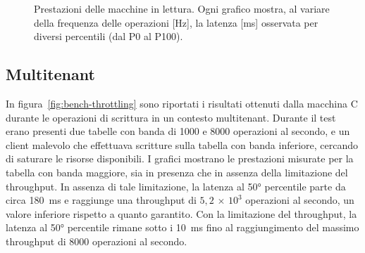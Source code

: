 \begin{figure}[htbp]
    \caption{Prestazioni delle macchine in lettura. Ogni grafico mostra, al variare della frequenza delle operazioni [Hz], la latenza [ms] osservata per diversi percentili (dal P0 al P100).}
    \label{fig:bench-get}
\end{figure}

\subsection{Multitenant}
\label{subsec:risultati-multitenant}

In figura~\ref{fig:bench-throttling} sono riportati i risultati ottenuti dalla macchina C durante le operazioni di scrittura in un contesto multitenant.
Durante il test erano presenti due tabelle con banda di 1000 e 8000 operazioni al secondo, e un client malevolo che effettuava scritture sulla tabella con banda inferiore, cercando di saturare le risorse disponibili.
I grafici mostrano le prestazioni misurate per la tabella con banda maggiore, sia in presenza che in assenza della limitazione del throughput.
In assenza di tale limitazione, la latenza al 50° percentile parte da circa 180~ms e raggiunge una throughput di $5{,}2\,{\times}\,10^3$ operazioni al secondo, un valore inferiore rispetto a quanto garantito.
Con la limitazione del throughput, la latenza al 50° percentile rimane sotto i 10~ms fino al raggiungimento del massimo throughput di 8000 operazioni al secondo.

